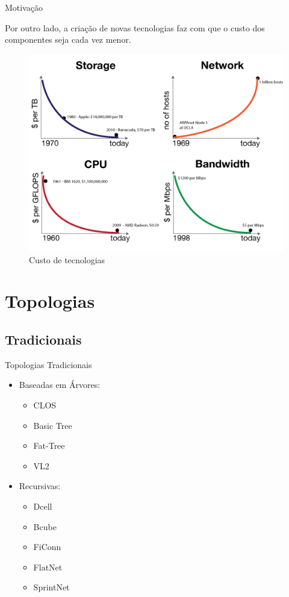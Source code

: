 \documentclass[aspectratio=169]{beamer}
\begin{document}
			
		\begin{frame} {Motivação}
				
			\Large
			Por outro lado, a criação de novas tecnologias faz com que o custo dos componentes seja cada vez menor.
			\begin{figure}[ht]    
						    \includegraphics[scale=0.35]{imagens/custo.png}
						    \caption{Custo de tecnologias}
						    \label{fig:sample_figure}
						\end{figure}
		\end{frame}	
			
		
	
\section{Topologias}
	\subsection{Tradicionais}

	\begin{frame} {Topologias Tradicionais}
	\begin{itemize}
	 	\item
	 		Baseadas em Árvores:
			\begin{itemize}
			 	\item
			 		CLOS
			 	\item
					Basic Tree
			 	\item
					Fat-Tree
			 	\item
					VL2
			 \end{itemize}
	 \end{itemize}

	\begin{itemize}
	 	\item
	 		Recursivas:
			\begin{itemize}
			 	\item
			 		Dcell
			 	\item
					Bcube
			 	\item
					FiConn
			 	\item
					FlatNet
			 	\item
					SprintNet
			 \end{itemize}
	 \end{itemize}
	\end{frame}
\end{document}
